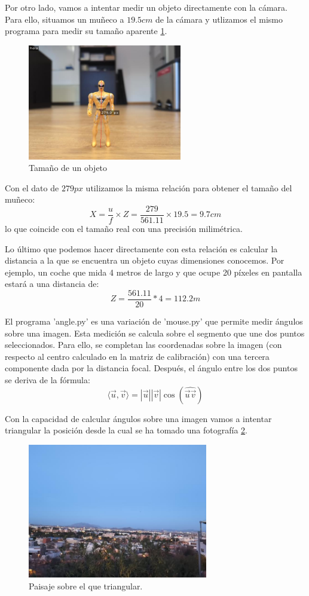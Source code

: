 \documentclass[12pt]{article}
\begin{document}
Por otro lado, vamos a intentar medir un objeto directamente con la cámara.
Para ello, situamos un muñeco a $19.5cm$ de la cámara y utlizamos el mismo programa para medir su tamaño aparente \ref{fig:altura_objeto}.
\begin{figure}[H]
    \centering
    \includegraphics[width=0.6\textwidth]{images_calibracion/Altura_objeto.png}  
    \caption{Tamaño de un objeto}
    \label{fig:altura_objeto}
\end{figure}
Con el dato de $279px$ utilizamos la misma relación para obtener el tamaño del muñeco:
$$X = \frac{u}{f} \times Z= \frac{279}{561.11} \times 19.5 = 9.7 cm$$
lo que coincide con el tamaño real con una precisión milimétrica.

Lo último que podemos hacer directamente con esta relación es calcular la distancia a la que se encuentra un objeto cuyas dimensiones conocemos. Por ejemplo, un coche que mida 4 metros de largo y que ocupe 20 píxeles en pantalla estará a una distancia de:
$$
Z=\frac{561.11}{20}*4=112.2m
$$

El programa 'angle.py' es una variación de 'mouse.py' que permite medir ángulos sobre una imagen. Esta medición se calcula sobre el segmento que une dos puntos seleccionados.
Para ello, se completan las coordenadas sobre la imagen (con respecto al centro calculado en la matriz de calibración) con una tercera componente dada por la distancia focal.
Después, el ángulo entre los dos puntos se deriva de la fórmula:
$$
\langle \vec{u},\vec{v} \rangle = |\vec{u}||\vec{v}| \cos(\widehat{\vec{u}\vec{v}})
$$ 

Con la capacidad de calcular ángulos sobre una imagen vamos a intentar triangular la posición desde la cual se ha tomado una fotografía \ref{fig:paisaje}. 
\begin{figure}[h!]
    \centering
    \includegraphics[width=0.7\textwidth]{images_calibracion/Paisaje.png} 
    \caption{Paisaje sobre el que triangular.}
    \label{fig:paisaje}
\end{figure}
\end{document}
